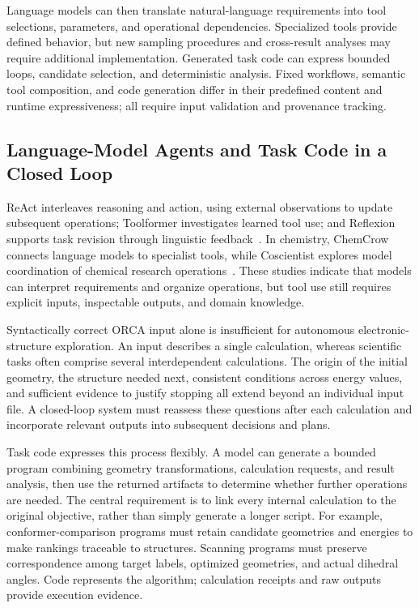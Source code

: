 Language models can then translate natural-language requirements into tool selections, parameters, and operational dependencies.
Specialized tools provide defined behavior, but new sampling procedures and cross-result analyses may require additional implementation.
Generated task code can express bounded loops, candidate selection, and deterministic analysis.
Fixed workflows, semantic tool composition, and code generation differ in their predefined content and runtime expressiveness; all require input validation and provenance tracking.

\subsection{Language-Model Agents and Task Code in a Closed Loop}
ReAct interleaves reasoning and action, using external observations to update subsequent operations; Toolformer investigates learned tool use; and Reflexion supports task revision through linguistic feedback~\cite{react,toolformer,reflexion}.
In chemistry, ChemCrow connects language models to specialist tools, while Coscientist explores model coordination of chemical research operations~\cite{chemcrow,coscientist}.
These studies indicate that models can interpret requirements and organize operations, but tool use still requires explicit inputs, inspectable outputs, and domain knowledge.

Syntactically correct ORCA input alone is insufficient for autonomous electronic-structure exploration.
An input describes a single calculation, whereas scientific tasks often comprise several interdependent calculations.
The origin of the initial geometry, the structure needed next, consistent conditions across energy values, and sufficient evidence to justify stopping all extend beyond an individual input file.
A closed-loop system must reassess these questions after each calculation and incorporate relevant outputs into subsequent decisions and plans.

Task code expresses this process flexibly.
A model can generate a bounded program combining geometry transformations, calculation requests, and result analysis, then use the returned artifacts to determine whether further operations are needed.
The central requirement is to link every internal calculation to the original objective, rather than simply generate a longer script.
For example, conformer-comparison programs must retain candidate geometries and energies to make rankings traceable to structures.
Scanning programs must preserve correspondence among target labels, optimized geometries, and actual dihedral angles.
Code represents the algorithm; calculation receipts and raw outputs provide execution evidence.

